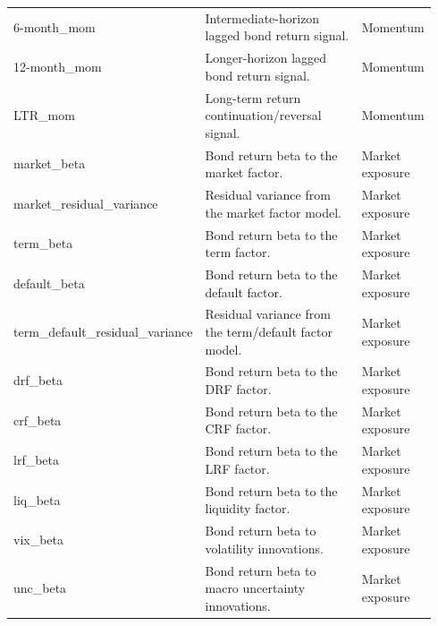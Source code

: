\documentclass[11pt]{article}
\begin{document}
\begin{landscape}
\begin{longtable}{p{0.17\linewidth}p{0.62\linewidth}p{0.15\linewidth}}
6-month\_mom & Intermediate-horizon lagged bond return signal. & Momentum \\
12-month\_mom & Longer-horizon lagged bond return signal. & Momentum \\
LTR\_mom & Long-term return continuation/reversal signal. & Momentum \\
market\_beta & Bond return beta to the market factor. & Market exposure \\
market\_residual\_variance & Residual variance from the market factor model. & Market exposure \\
term\_beta & Bond return beta to the term factor. & Market exposure \\
default\_beta & Bond return beta to the default factor. & Market exposure \\
term\_default\_residual\_variance & Residual variance from the term/default factor model. & Market exposure \\
drf\_beta & Bond return beta to the DRF factor. & Market exposure \\
crf\_beta & Bond return beta to the CRF factor. & Market exposure \\
lrf\_beta & Bond return beta to the LRF factor. & Market exposure \\
liq\_beta & Bond return beta to the liquidity factor. & Market exposure \\
vix\_beta & Bond return beta to volatility innovations. & Market exposure \\
unc\_beta & Bond return beta to macro uncertainty innovations. & Market exposure \\
\end{longtable}
\end{landscape}
\end{document}
